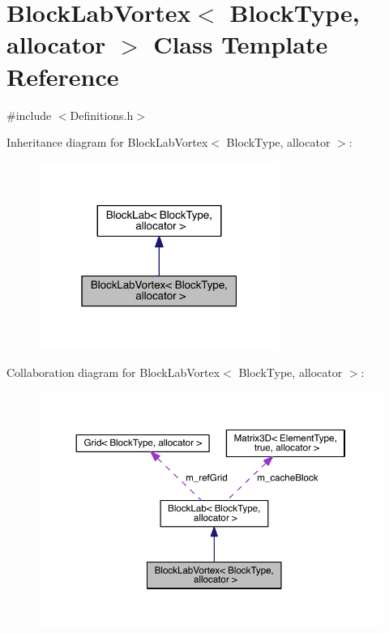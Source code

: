 \hypertarget{class_block_lab_vortex}{}\section{Block\+Lab\+Vortex$<$ Block\+Type, allocator $>$ Class Template Reference}
\label{class_block_lab_vortex}


{\ttfamily \#include $<$Definitions.\+h$>$}



Inheritance diagram for Block\+Lab\+Vortex$<$ Block\+Type, allocator $>$\+:\nopagebreak
\begin{figure}[H]
\begin{center}
\leavevmode
\includegraphics[width=223pt]{da/d22/class_block_lab_vortex__inherit__graph}
\end{center}
\end{figure}


Collaboration diagram for Block\+Lab\+Vortex$<$ Block\+Type, allocator $>$\+:\nopagebreak
\begin{figure}[H]
\begin{center}
\leavevmode
\includegraphics[width=350pt]{de/d72/class_block_lab_vortex__coll__graph}
\end{center}
\end{figure}
